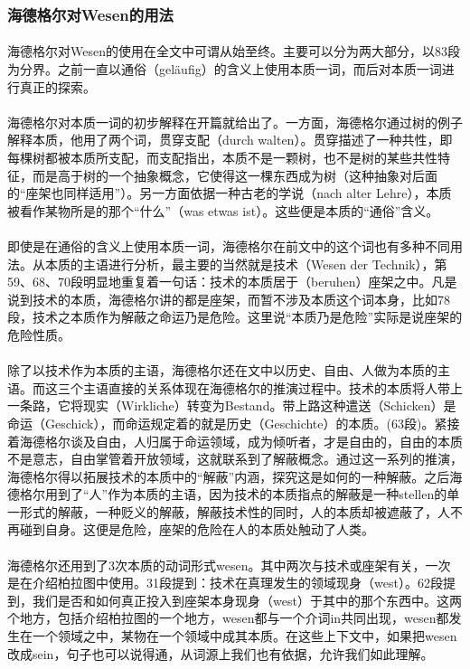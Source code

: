 \documentclass{article}
\begin{document}
		\subsubsection{海德格尔对Wesen的用法}
			\paragraph{}
		海德格尔对Wesen的使用在全文中可谓从始至终。主要可以分为两大部分，以83段为分界。之前一直以通俗（geläufig）的含义上使用本质一词，而后对本质一词进行真正的探索。
			\paragraph{}
		海德格尔对本质一词的初步解释在开篇就给出了。一方面，海德格尔通过树的例子解释本质，他用了两个词，贯穿支配（durch walten）。贯穿描述了一种共性，即每棵树都被本质所支配，而支配指出，本质不是一颗树，也不是树的某些共性特征，而是高于树的一个抽象概念，它使得这一棵东西成为树（这种抽象对后面的“座架也同样适用”）。另一方面依据一种古老的学说（nach alter Lehre），本质被看作某物所是的那个“什么”（was etwas ist）。这些便是本质的“通俗”含义。
			\paragraph{}
		即使是在通俗的含义上使用本质一词，海德格尔在前文中的这个词也有多种不同用法。从本质的主语进行分析，最主要的当然就是技术（Wesen der Technik），第59、68、70段明显地重复着一句话：技术的本质居于（beruhen）座架之中。凡是说到技术的本质，海德格尔讲的都是座架，而暂不涉及本质这个词本身，比如78段，技术之本质作为解蔽之命运乃是危险。这里说“本质乃是危险”实际是说座架的危险性质。
			\paragraph{}
		除了以技术作为本质的主语，海德格尔还在文中以历史、自由、人做为本质的主语。而这三个主语直接的关系体现在海德格尔的推演过程中。技术的本质将人带上一条路，它将现实（Wirkliche）转变为Bestand。带上路这种遣送（Schicken）是命运（Geschick），而命运规定着的就是历史（Geschichte）的本质。(63段)。紧接着海德格尔谈及自由，人归属于命运领域，成为倾听者，才是自由的，自由的本质不是意志，自由掌管着开放领域，这就联系到了解蔽概念。通过这一系列的推演，海德格尔得以拓展技术的本质中的“解蔽”内涵，探究这是如何的一种解蔽。之后海德格尔用到了“人”作为本质的主语，因为技术的本质指点的解蔽是一种stellen的单一形式的解蔽，一种贬义的解蔽，解蔽技术性的同时，人的本质却被遮蔽了，人不再碰到自身。这便是危险，座架的危险在人的本质处触动了人类。
			\paragraph{}
		海德格尔还用到了3次本质的动词形式wesen。其中两次与技术或座架有关，一次是在介绍柏拉图中使用。31段提到：技术在真理发生的领域现身（west）。62段提到，我们是否和如何真正投入到座架本身现身（west）于其中的那个东西中。这两个地方，包括介绍柏拉图的一个地方，wesen都与一个介词in共同出现，wesen都发生在一个领域之中，某物在一个领域中成其本质。在这些上下文中，如果把wesen改成sein，句子也可以说得通，从词源上我们也有依据，允许我们如此理解。
\end{document}
